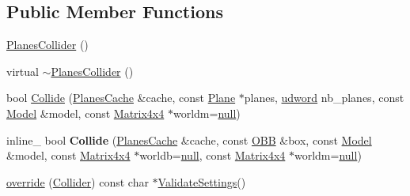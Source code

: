 \subsection*{Public Member Functions}
\begin{DoxyCompactItemize}
\item 
\hyperlink{classOpcode_1_1PlanesCollider_a85d977a4cffea432c5dd82861eb96dfb}{Planes\+Collider} ()
\item 
virtual \hyperlink{classOpcode_1_1PlanesCollider_a497b9251065bc7b3ebf4a2ec9e23d52d}{$\sim$\+Planes\+Collider} ()
\item 
bool \hyperlink{classOpcode_1_1PlanesCollider_aa5a7c2fb04b8842f5df317dfc3c15df6}{Collide} (\hyperlink{structOpcode_1_1PlanesCache}{Planes\+Cache} \&cache, const \hyperlink{classOpcode_1_1Plane}{Plane} $\ast$planes, \hyperlink{IceTypes_8h_a44c6f1920ba5551225fb534f9d1a1733}{udword} nb\+\_\+planes, const \hyperlink{classOpcode_1_1Model}{Model} \&model, const \hyperlink{classOpcode_1_1Matrix4x4}{Matrix4x4} $\ast$worldm=\hyperlink{IceTypes_8h_ac97b8ee753e4405397a42ad5799b0f9e}{null})
\item 
inline\+\_\+ bool {\bfseries Collide} (\hyperlink{structOpcode_1_1PlanesCache}{Planes\+Cache} \&cache, const \hyperlink{classOpcode_1_1OBB}{O\+BB} \&box, const \hyperlink{classOpcode_1_1Model}{Model} \&model, const \hyperlink{classOpcode_1_1Matrix4x4}{Matrix4x4} $\ast$worldb=\hyperlink{IceTypes_8h_ac97b8ee753e4405397a42ad5799b0f9e}{null}, const \hyperlink{classOpcode_1_1Matrix4x4}{Matrix4x4} $\ast$worldm=\hyperlink{IceTypes_8h_ac97b8ee753e4405397a42ad5799b0f9e}{null})\hypertarget{classOpcode_1_1PlanesCollider_a90d045cbffc478ffc11e32fa1eef0b77}{}\label{classOpcode_1_1PlanesCollider_a90d045cbffc478ffc11e32fa1eef0b77}

\item 
\hyperlink{classOpcode_1_1PlanesCollider_a150ad13d0a23a7a132b9056a2207a2e7}{override} (\hyperlink{classOpcode_1_1Collider}{Collider}) const char $\ast$\hyperlink{classOpcode_1_1Collider_a9099aa79f7b57fe4018f37e967cc6be5}{Validate\+Settings}()
\end{DoxyCompactItemize}
